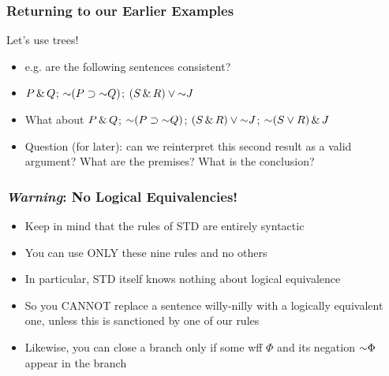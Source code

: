\begin{frame}
\frametitle{Returning to our Earlier Examples}

Let's use trees! 

\begin{itemize}[<+->]

\item e.g. are the following sentences consistent? 

\item $P \,\&\, Q$; $\enot (P \eif \enot Q)$; $(S \eand R) \eor \enot J$

\item What about $P \,\&\, Q$; $\enot (P \eif \enot Q)$; $(S \eand R) \eor \enot J$; $\enot (S \eor R) \eand J$

\item Question (for later): can we reinterpret this second result as a valid argument? What are the premises? What is the conclusion? 



\end{itemize}
\end{frame}

\begin{frame}
\frametitle{\textit{Warning}: No Logical Equivalencies!}

\begin{itemize}[<+->]

\item Keep in mind that the rules of STD are entirely syntactic

\item You can use ONLY these nine rules and no others

\item In particular, STD itself knows nothing about logical equivalence

\item So you CANNOT replace a sentence willy-nilly with a logically equivalent one, unless this is sanctioned by one of our rules

\item Likewise, you can close a branch only if some wff $\Phi$ and its negation $\enot \Phi$ appear in the branch 

\end{itemize}
\end{frame}


